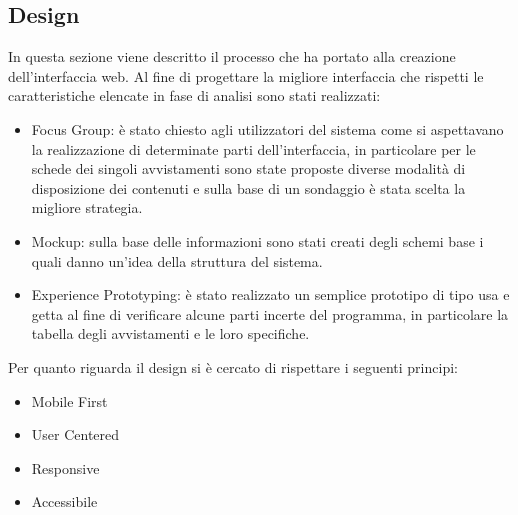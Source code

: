 \documentclass[a4paper,final,12pt]{report}
\begin{document}
\subsection{Design}
In questa sezione viene descritto il processo che ha portato alla creazione dell'interfaccia web.
Al fine di progettare la migliore interfaccia che rispetti le caratteristiche elencate in fase di analisi sono stati realizzati:
\begin{itemize}
\item Focus Group: è stato chiesto agli utilizzatori del sistema come si aspettavano la realizzazione di determinate parti dell'interfaccia, in particolare per le schede dei singoli avvistamenti sono state proposte diverse modalità di disposizione dei contenuti e sulla base di un sondaggio è stata scelta la migliore strategia.
\item Mockup: sulla base delle informazioni sono stati creati degli schemi base i quali danno un'idea della struttura del sistema.
\item Experience Prototyping: è stato realizzato un semplice prototipo di tipo usa e getta al fine di verificare alcune parti incerte del programma, in particolare la tabella degli avvistamenti e le loro specifiche.
\end{itemize}
Per quanto riguarda il design si è cercato di rispettare i seguenti principi:
\begin{itemize}
\item Mobile First
\item User Centered
\item Responsive
\item Accessibile
\end{itemize}
\end{document}
